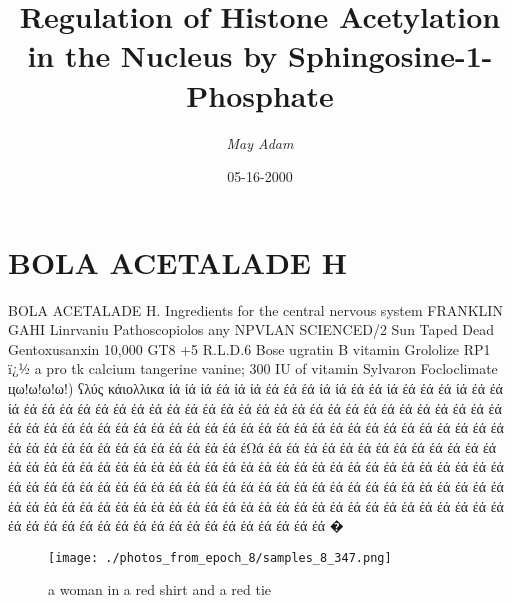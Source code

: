 \documentclass{article}%
\title{Regulation of Histone Acetylation in the Nucleus by Sphingosine{-}1{-}Phosphate}%
\author{\textit{May Adam}}%
\date{05-16-2000}%
\begin{document}
%
\normalsize%
\maketitle%
\section{BOLA ACETALADE H}%
\label{sec:BOLAACETALADEH}%
BOLA ACETALADE H. Ingredients for the central nervous system\newline%
FRANKLIN GAHI Linrvaniu Pathoscopiolos any\newline%
NPVLAN SCIENCED/2 Sun Taped Dead Gentoxusanxin 10,000 GT8 +5 R.L.D.6 Bose ugratin B vitamin Grololize RP1 ï¿½ a pro tk calcium tangerine vanine; 300 IU of vitamin Sylvaron Focloclimate цω!ω!ω!ω!) ʕλύς κάιολλικα ίά ίά ίά έά ίά ίά έά έά έά ίά ίά έά έά ίά έά έά έά ίά έά έά ίά έά έά έά έά έά έά έά έά έά έά έά έά έά έά έά έά έά έά έά έά έά έά έά έά έά έά έά έά έά έά έά έά έά έά έά έά έά έά έά έά έά έά έά έά έά έά έά έά έά έά έά έά έά έά έά έά έά έά έά έά έά έά έά έά έά έά έά έά έΩά έά έά έά έά έά έά έά έά έά έά έά έά έά έά έά έά έά έά έά έά έά έά έά έά έά έά έά έά έά έά έά έά έά έά έά έά έά έά έά έά έά έά έά έά έά έά έά έά έά έά έά έά έά έά έά έά έά έά έά έά έά έά έά έά έά έά έά έά έά έά έά έά έά έά έά έά έά έά έά έά έά έά έά έά έά έά έά έά έά έά έά έά έά έά έά έά έά έά έά έά έά έά έά έά έά έά έά έά έά έά έά έά έά έά έά �

%


\begin{figure}[h!]%
\centering%
\texttt{[image: ./photos\_from\_epoch\_8/samples\_8\_347.png]}%
\caption{a woman in a red shirt and a red tie}%
\end{figure}

%
\end{document}
